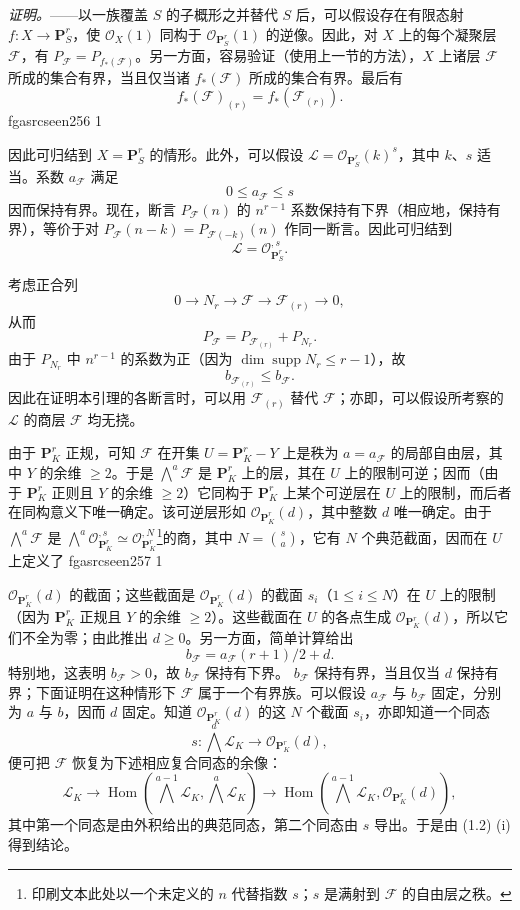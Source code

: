 \documentclass[12pt,twoside,openany]{book}
\numberwithin{equation}{section}
\newcommand{\fgaunitid}{unbound}
\newcommand{\src}[1]{%
  \phantomsection
  \hypertarget{src:\fgaunitid:#1}{}%
  \hypertarget{fga.\fgaunitid.p#1}{}%
  \ifcsname fgasrcseen#1\endcsname\else
    \expandafter\gdef\csname fgasrcseen#1\endcsname{1}%
    \hypertarget{src:#1}{}%
  \fi
  \marginpar{\raggedleft\footnotesize\sffamily #1}%
}
\theoremstyle{plain}
\theoremstyle{definition}
\theoremstyle{remark}
\begin{document}
\emph{证明。}——以一族覆盖 $S$ 的子概形之并替代 $S$ 后，可以假设存在有限态射
$f:X\longrightarrow\mathbf P^r_S$，使 $\mathcal O_X(1)$ 同构于
$\mathcal O_{\mathbf P^r_S}(1)$ 的逆像。因此，对 $X$ 上的每个凝聚层
$\mathcal F$，有
$P_{\mathcal F}=P_{f_*(\mathcal F)}$。另一方面，容易验证（使用上一节的方法），$X$ 上诸层 $\mathcal F$ 所成的集合有界，当且仅当诸
$f_*(\mathcal F)$ 所成的集合有界。最后有
\[
f_*(\mathcal F)_{(r)}=f_*(\mathcal F_{(r)}).
\]
\src{256}
因此可归结到 $X=\mathbf P^r_S$ 的情形。此外，可以假设
$\mathcal L=\mathcal O_{\mathbf P^r_S}(k)^s$，其中 $k$、$s$ 适当。系数
$a_{\mathcal F}$ 满足
\[
0\leq a_{\mathcal F}\leq s
\]
因而保持有界。现在，断言 $P_{\mathcal F}(n)$ 的 $n^{r-1}$ 系数保持有下界（相应地，保持有界），等价于对
$P_{\mathcal F}(n-k)=P_{\mathcal F(-k)}(n)$ 作同一断言。因此可归结到
\[
\mathcal L=\mathcal O_{\mathbf P^r_S}^{,s}.
\]

考虑正合列
\[
0\longrightarrow N_r\longrightarrow\mathcal F
\longrightarrow\mathcal F_{(r)}\longrightarrow0,
\]
从而
\[
P_{\mathcal F}=P_{\mathcal F_{(r)}}+P_{N_r}.
\]
由于 $P_{N_r}$ 中 $n^{r-1}$ 的系数为正（因为
$\dim\operatorname{supp}N_r\leq r-1$），故
\[
b_{\mathcal F_{(r)}}\leq b_{\mathcal F}.
\]
因此在证明本引理的各断言时，可以用 $\mathcal F_{(r)}$ 替代
$\mathcal F$；亦即，可以假设所考察的 $\mathcal L$ 的商层
$\mathcal F$ 均无挠。

由于 $\mathbf P^r_K$ 正规，可知 $\mathcal F$ 在开集
$U=\mathbf P^r_K-Y$ 上是秩为 $a=a_{\mathcal F}$ 的局部自由层，其中
$Y$ 的余维 $\geq2$。于是 $\bigwedge^a\mathcal F$ 是
$\mathbf P^r_K$ 上的层，其在 $U$ 上的限制可逆；因而（由于
$\mathbf P^r_K$ 正则且 $Y$ 的余维 $\geq2$）它同构于
$\mathbf P^r_K$ 上某个可逆层在 $U$ 上的限制，而后者在同构意义下唯一确定。该可逆层形如
$\mathcal O_{\mathbf P^r_K}(d)$，其中整数 $d$ 唯一确定。由于
$\bigwedge^a\mathcal F$ 是
$\bigwedge^a\mathcal O_{\mathbf P^r_K}^{,s}\simeq
\mathcal O_{\mathbf P^r_K}^{,N}$\footnote{印刷文本此处以一个未定义的
$n$ 代替指数 $s$；$s$ 是满射到 $\mathcal F$ 的自由层之秩。}的商，其中
$N=\binom{s}{a}$，它有 $N$ 个典范截面，因而在 $U$ 上定义了
\src{257}
$\mathcal O_{\mathbf P^r_K}(d)$ 的截面；这些截面是
$\mathcal O_{\mathbf P^r_K}(d)$ 的截面 $s_i$（$1\leq i\leq N$）在
$U$ 上的限制（因为 $\mathbf P^r_K$ 正规且 $Y$ 的余维 $\geq2$）。这些截面在 $U$ 的各点生成
$\mathcal O_{\mathbf P^r_K}(d)$，所以它们不全为零；由此推出
$d\geq0$。另一方面，简单计算给出
\[
b_{\mathcal F}=a_{\mathcal F}(r+1)/2+d.
\]
特别地，这表明 $b_{\mathcal F}>0$，故 $b_{\mathcal F}$ 保持有下界。
$b_{\mathcal F}$ 保持有界，当且仅当 $d$ 保持有界；下面证明在这种情形下 $\mathcal F$ 属于一个有界族。可以假设
$a_{\mathcal F}$ 与 $b_{\mathcal F}$ 固定，分别为 $a$ 与 $b$，因而
$d$ 固定。知道 $\mathcal O_{\mathbf P^r_K}(d)$ 的这 $N$ 个截面
$s_i$，亦即知道一个同态
\[
s:\bigwedge^a\mathcal L_K\longrightarrow\mathcal O_{\mathbf P^r_K}(d),
\]
便可把 $\mathcal F$ 恢复为下述相应复合同态的余像：
\[
\mathcal L_K\longrightarrow
\operatorname{Hom}\!\left(\bigwedge^{a-1}\mathcal L_K,
\bigwedge^a\mathcal L_K\right)\longrightarrow
\operatorname{Hom}\!\left(\bigwedge^{a-1}\mathcal L_K,
\mathcal O_{\mathbf P^r_K}(d)\right),
\]
其中第一个同态是由外积给出的典范同态，第二个同态由 $s$ 导出。于是由
(1.2) (i) 得到结论。
\end{document}
